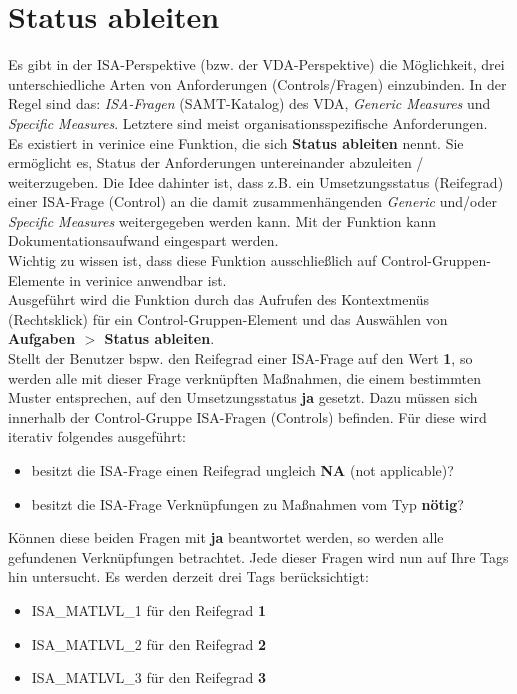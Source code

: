 \documentclass[a4paper,10pt]{book}
\begin{document}
\section{Status ableiten}
Es gibt in der ISA-Perspektive (bzw. der VDA-Perspektive) die Möglichkeit, drei unterschiedliche Arten von Anforderungen (Controls/Fragen) einzubinden.
In der Regel sind das: \textit{ISA-Fragen} (SAMT-Katalog) des VDA, \textit{Generic Measures} und \textit{Specific Measures}. Letztere sind meist
organisationsspezifische Anforderungen.
\newline\\
Es existiert in verinice eine Funktion, die sich \textbf{Status ableiten} nennt. Sie ermöglicht es, Status der Anforderungen untereinander
abzuleiten / weiterzugeben. Die Idee dahinter ist, dass z.B. ein Umsetzungsstatus (Reifegrad) einer ISA-Frage (Control) an die damit zusammenhängenden \textit{Generic} und/oder \textit{Specific Measures} weitergegeben werden kann. Mit der Funktion kann Dokumentationsaufwand eingespart werden.
\newline\\
Wichtig zu wissen ist, dass diese Funktion ausschließlich auf Control-Gruppen-Elemente in verinice anwendbar ist.
\newline\\
Ausgeführt wird die Funktion durch das Aufrufen des Kontextmenüs (Rechtsklick) für ein Control-Gruppen-Element und das Auswählen von \textbf{Aufgaben $>$ Status ableiten}.
\newline\\
Stellt der Benutzer bspw. den Reifegrad einer ISA-Frage auf den Wert \textbf{1}, so werden alle mit dieser Frage verknüpften Maßnahmen, die einem bestimmten Muster entsprechen, auf den Umsetzungsstatus \textbf{ja} gesetzt.
Dazu müssen sich innerhalb der Control-Gruppe ISA-Fragen (Controls) befinden. Für diese wird iterativ folgendes ausgeführt:
\begin{itemize}
 \item besitzt die ISA-Frage einen Reifegrad ungleich \textbf{NA} (not applicable)?
 \item besitzt die ISA-Frage Verknüpfungen zu Maßnahmen vom Typ \textbf{nötig}?
\end{itemize}
Können diese beiden Fragen mit \textbf{ja} beantwortet werden, so werden alle gefundenen Verknüpfungen betrachtet. Jede dieser Fragen wird nun auf Ihre Tags hin untersucht. Es werden derzeit drei Tags berücksichtigt:
\begin{itemize}
 \item ISA\_MATLVL\_1 für den Reifegrad \textbf{1}
 \item ISA\_MATLVL\_2 für den Reifegrad \textbf{2}
 \item ISA\_MATLVL\_3 für den Reifegrad \textbf{3}
\end{itemize}
\end{document}
